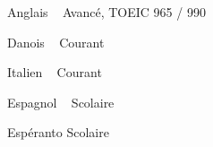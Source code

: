 


\begin{cvskills}

  \cvskill
    {Anglais ~ \emojiflagus} %
    {Avancé, TOEIC 965 / 990} %

  \cvskill
    {Danois ~ \emojiflagdk} %
    {Courant} %

  \cvskill
    {Italien ~ \emojiflagit} %
    {Courant} %

  \cvskill
    {Espagnol ~ \emojiflages} %
    {Scolaire} %

  \cvskill
    {Espéranto} %
    {Scolaire} %

\end{cvskills}
